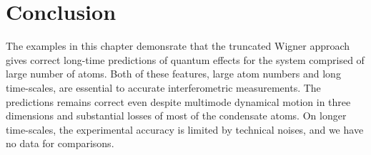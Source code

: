 \section{Conclusion}

The examples in this chapter demonsrate that the truncated Wigner approach gives correct long-time predictions of quantum effects for the system comprised of large number of atoms.
Both of these features, large atom numbers and long time-scales, are essential to accurate interferometric measurements.
The predictions remains correct even despite multimode dynamical motion in three dimensions and substantial losses of most of the condensate atoms.
On longer time-scales, the experimental accuracy is limited by technical noises, and we have no data for comparisons.
